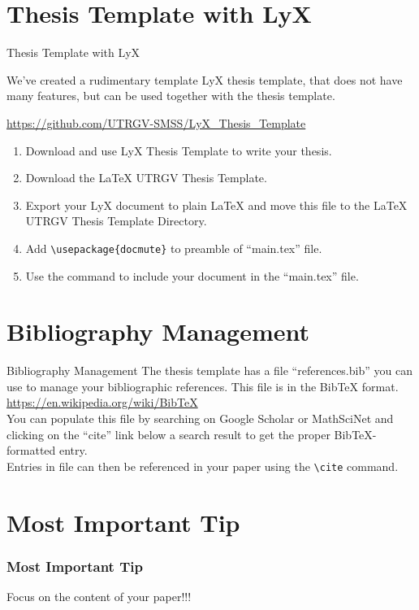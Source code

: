 \documentclass{beamer}
\begin{document}
\section{Thesis Template with LyX}
\begin{frame}[fragile]{Thesis Template with LyX}

  We've created a rudimentary template LyX thesis template,
  that does not have many features, but can be used together with the
  thesis template.

  \url{https://github.com/UTRGV-SMSS/LyX_Thesis_Template}\\

  \begin{enumerate}
      \item
        Download and use LyX Thesis Template to write your thesis.
      \item
        Download the \LaTeX{} UTRGV Thesis Template.
      \item
        Export your LyX document to plain \LaTeX{} and move this file
        to the \LaTeX{} UTRGV Thesis Template Directory.
      \item
        Add \verb|\usepackage{docmute}| to preamble of ``main.tex'' file.
      \item
        Use the \verb|| command to include your document in the
        ``main.tex'' file.

  \end{enumerate}
\end{frame}

\section{Bibliography Management}
\begin{frame}[fragile]{Bibliography Management}
  The thesis template has a file ``references.bib'' you can use
  to manage your bibliographic references. This file is in the BibTeX format.
  \url{https://en.wikipedia.org/wiki/BibTeX}\\

  You can populate this file by searching on Google Scholar or MathSciNet and
  clicking on the ``cite'' link below a search result to get the proper
  BibTeX-formatted entry.\\

  Entries in file can then be referenced in your paper using
  the \verb|\cite| command.


\end{frame}


\section{Most Important Tip}
\begin{frame}
\frametitle{Most Important Tip}
{\LARGE\centering
    Focus on the content of your paper!!! \\
}
\end{frame}
\end{document}
